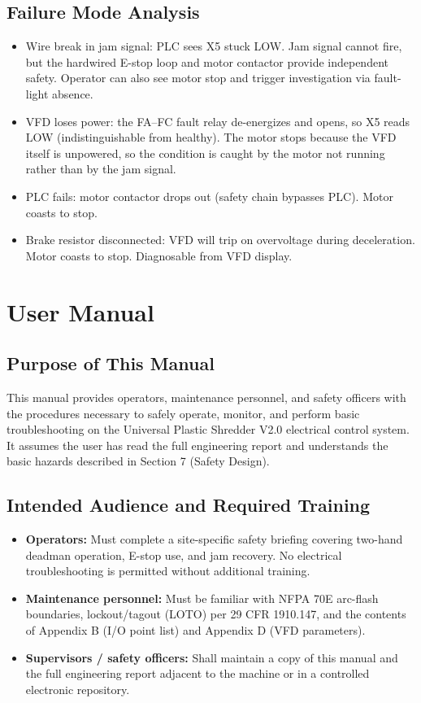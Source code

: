 \documentclass[hidelinks,12pt]{article}
\begin{document}
\subsection{Failure Mode Analysis}
\begin{itemize}
    \item Wire break in jam signal: PLC sees X5 stuck LOW. Jam signal cannot fire, but the hardwired E-stop loop and motor contactor provide independent safety. Operator can also see motor stop and trigger investigation via fault-light absence.
    \item VFD loses power: the FA--FC fault relay de-energizes and opens, so X5 reads LOW (indistinguishable from healthy). The motor stops because the VFD itself is unpowered, so the condition is caught by the motor not running rather than by the jam signal.
    \item PLC fails: motor contactor drops out (safety chain bypasses PLC). Motor coasts to stop.
    \item Brake resistor disconnected: VFD will trip on overvoltage during deceleration. Motor coasts to stop. Diagnosable from VFD display.
\end{itemize}

\newpage
\section{User Manual}

\subsection{Purpose of This Manual}
This manual provides operators, maintenance personnel, and safety officers with the procedures necessary to safely operate, monitor, and perform basic troubleshooting on the Universal Plastic Shredder V2.0 electrical control system. It assumes the user has read the full engineering report and understands the basic hazards described in Section 7 (Safety Design).

\subsection{Intended Audience and Required Training}
\begin{itemize}
    \item \textbf{Operators:} Must complete a site-specific safety briefing covering two-hand deadman operation, E-stop use, and jam recovery. No electrical troubleshooting is permitted without additional training.
    \item \textbf{Maintenance personnel:} Must be familiar with NFPA 70E arc-flash boundaries, lockout/tagout (LOTO) per 29 CFR 1910.147, and the contents of Appendix B (I/O point list) and Appendix D (VFD parameters).
    \item \textbf{Supervisors / safety officers:} Shall maintain a copy of this manual and the full engineering report adjacent to the machine or in a controlled electronic repository.
\end{itemize}
\end{document}
